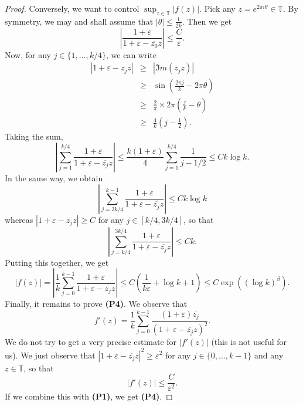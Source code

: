 \documentclass[11pt,a4paper]{amsart}
\theoremstyle{plain}
\begin{document}
\begin{proof}
Conversely, we want to control $\sup_{z\in{\mathbb T}}|f(z)|$. Pick any $z=e^{2\pi i\theta}\in{\mathbb T}$.
By symmetry, we may and shall assume that $|\theta|\leq\frac1{2k}$. Then we get
$$\left|\frac{1+{\varepsilon}}{1+{\varepsilon}-\overline{z_0}z}\right|\leq\frac{C}{\varepsilon}.$$
Now, for any $j\in\{1,\dots,k/4\}$, we can write
\begin{eqnarray*}
|1+{\varepsilon}-\overline{z_j}z|&\geq& |\Im m(\overline{z_j}z)|\\
&\geq&\sin\left(\frac{2\pi j}k-2\pi\theta\right)\\
&\geq&\frac2\pi\times2\pi \left(\frac jk-\theta\right)\\
&\geq&\frac{4}k\left(j-\frac12\right).
\end{eqnarray*}
Taking the sum, 
$$\left|\sum_{j=1}^{k/4}\frac{1+{\varepsilon}}{1+{\varepsilon}-\overline{z_j}z}\right|
\leq \frac{k(1+{\varepsilon})}4\sum_{j=1}^{k/4}\frac{1}{j-1/2}\leq Ck\log k.$$
In the same way, we obtain
$$\left|\sum_{j=3k/4}^{k-1}\frac{1+{\varepsilon}}{1+{\varepsilon}-\overline{z_j}z}\right|
\leq Ck\log k$$
whereas $|1+{\varepsilon}-\overline{z_j}z|\geq C$ for any $j\in[k/4,3k/4]$, so that
$$\left|\sum_{j=k/4}^{3k/4}\frac{1+{\varepsilon}}{1+{\varepsilon}-\overline{z_j}z}\right|
\leq Ck.$$
Putting this together, we get 
$$|f(z)|=\left|\frac1k\sum_{j=0}^{k-1}\frac{1+{\varepsilon}}{1+{\varepsilon}-\overline{z_j}z}\right|\leq C\left(\frac{1}{k{\varepsilon}}+\log k+1\right)\leq C\exp\left((\log k)^\beta\right).$$
Finally, it remains to prove \textbf{(P4)}. We observe that
$$f'(z)=\frac1k\sum_{j=0}^{k-1}\frac{(1+{\varepsilon})\overline{z_j}}{(1+{\varepsilon}-\overline{z_j}z)^2}.$$
We do not try to get a very precise estimate for $|f'(z)|$ (this is not useful for us). We just observe
that $|1+{\varepsilon}-\overline{z_j}z|^2\geq{\varepsilon}^2$ for any $j\in\{0,\dots,k-1\}$ and any $z\in{\mathbb T}$, so that
$$|f'(z)|\leq\frac{C}{{\varepsilon}^2}.$$
If we combine this with \textbf{(P1)}, we get \textbf{(P4)}.
\medskip


\end{proof}
\end{document}
